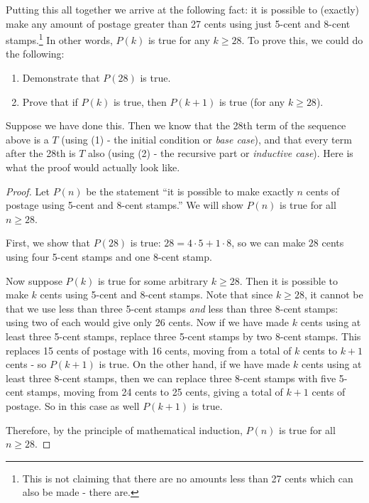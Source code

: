 \documentclass[12pt]{article}
\begin{document}
Putting this all together we arrive at the following fact: it is possible to (exactly) make any amount of postage greater than 27 cents using just 5-cent and 8-cent stamps.\footnote{This is not claiming that there are no amounts less than 27 cents which can also be made - there are.}  In other words, $P(k)$ is true for any $k \ge 28$.  To prove this, we could do the following: 

\begin{enumerate}
  \item Demonstrate that $P(28)$ is true.
  \item Prove that if $P(k)$ is true, then $P(k+1)$ is true (for any $k \ge 28$).
\end{enumerate}
  
Suppose we have done this.  Then we know that the 28th term of the sequence above is a $T$ (using (1) - the initial condition or {\em base case}), and that every term after the 28th is $T$ also (using (2) - the recursive part or {\em inductive case}).  Here is what the proof would actually look like.

\begin{proof}
  Let $P(n)$ be the statement ``it is possible to make exactly $n$ cents of postage using 5-cent and 8-cent stamps.''  We will show $P(n)$ is true for all $n \ge 28$.
  
  First, we show that $P(28)$ is true: $28 =  4 \cdot 5+ 1\cdot 8$, so we can make $28$ cents using four 5-cent stamps and one 8-cent stamp.  
  
  Now suppose $P(k)$ is true for some arbitrary $k \ge 28$.  Then it is possible to make $k$ cents using 5-cent and 8-cent stamps.  Note that since $k \ge 28$, it cannot be that we use less than three 5-cent stamps {\em and} less than three 8-cent stamps: using two of each would give only 26 cents.  Now if we have made $k$ cents using at least three 5-cent stamps, replace three 5-cent stamps by two 8-cent stamps.  This replaces 15 cents of postage with 16 cents, moving from a total of $k$ cents to $k+1$ cents - so $P(k+1)$ is true.  On the other hand, if we have made $k$ cents using at least three 8-cent stamps, then we can replace three 8-cent stamps with five 5-cent stamps, moving from 24 cents to 25 cents, giving a total of $k+1$ cents of postage.  So in this case as well $P(k+1)$ is true.  
  
  Therefore, by the principle of mathematical induction, $P(n)$ is true for all $n \ge 28$.
\end{proof}
\end{document}
